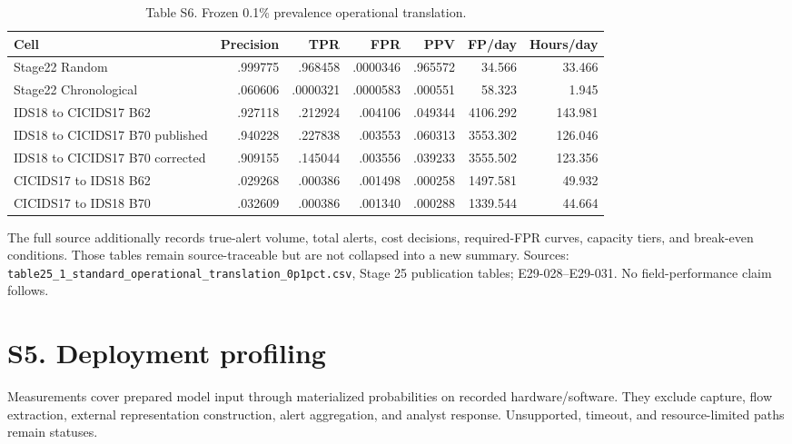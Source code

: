 \documentclass[preprint,12pt]{elsarticle}
\begin{document}
\begin{table}[htbp]
\centering\tiny
\caption{Table S6. Frozen 0.1\% prevalence operational translation.}
\begin{tabular}{@{}lrrrrrr@{}}
\toprule
Cell & Precision & TPR & FPR & PPV & FP/day & Hours/day\\
\midrule
Stage22 Random & .999775 & .968458 & .0000346 & .965572 & 34.566 & 33.466\\
Stage22 Chronological & .060606 & .0000321 & .0000583 & .000551 & 58.323 & 1.945\\
IDS18 to CICIDS17 B62 & .927118 & .212924 & .004106 & .049344 & 4106.292 & 143.981\\
IDS18 to CICIDS17 B70 published & .940228 & .227838 & .003553 & .060313 & 3553.302 & 126.046\\
IDS18 to CICIDS17 B70 corrected & .909155 & .145044 & .003556 & .039233 & 3555.502 & 123.356\\
CICIDS17 to IDS18 B62 & .029268 & .000386 & .001498 & .000258 & 1497.581 & 49.932\\
CICIDS17 to IDS18 B70 & .032609 & .000386 & .001340 & .000288 & 1339.544 & 44.664\\
\bottomrule
\end{tabular}
\end{table}
The full source additionally records true-alert volume, total alerts, cost decisions, required-FPR curves, capacity tiers, and break-even conditions. Those tables remain source-traceable but are not collapsed into a new summary. Sources: \texttt{table25\_1\_standard\_operational\_translation\_0p1pct.csv}, Stage 25 publication tables; E29-028--E29-031. No field-performance claim follows.

\section*{S5. Deployment profiling}
Measurements cover prepared model input through materialized probabilities on recorded hardware/software. They exclude capture, flow extraction, external representation construction, alert aggregation, and analyst response. Unsupported, timeout, and resource-limited paths remain statuses.
\end{document}
